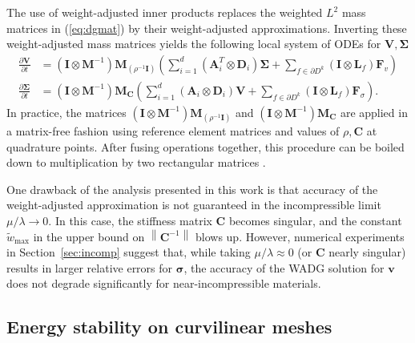 \documentclass{siamart0216}
\newcommand{\pd}[2]{\frac{\partial#1}{\partial#2}}
\newcommand{\nor}[1]{\left\| #1 \right\|}
\newcommand{\LRp}[1]{\left( #1 \right)}
\begin{document}
The use of weight-adjusted inner products replaces the weighted $L^2$ mass matrices in (\ref{eq:dgmat}) by their weight-adjusted approximations.  
Inverting these weight-adjusted mass matrices yields the following local system of ODEs for $\bm{V},\bm{\Sigma}$
\begin{align*}
\pd{\bm{V}}{t} &= \LRp{\bm{I}\otimes\bm{M}^{-1}} \bm{M}_{\LRp{\rho^{-1}\bm{I}}} \LRp{\sum_{i=1}^d  \LRp{\bm{A}_i^T\otimes \bm{D}_{i}} \bm{\Sigma} + \sum_{f\in \partial D^k}\LRp{\bm{I}\otimes \bm{L}_f}\bm{F}_{v}} \nonumber\\
\pd{\bm{\Sigma}}{t} &= \LRp{\bm{I}\otimes\bm{M}^{-1}} \bm{M}_{\bm{C}}  \LRp{\sum_{i=1}^d \LRp{\bm{A}_i\otimes \bm{D}_{i}}\bm{V}  +  \sum_{f\in \partial D^k}\LRp{\bm{I}\otimes\bm{L}_f}\bm{F}_{\sigma}}. 
\label{eq:wadgmat}
\end{align*}
In practice, the matrices $\LRp{\bm{I}\otimes\bm{M}^{-1}} \bm{M}_{\LRp{\rho^{-1}\bm{I}}}$ and $\LRp{\bm{I}\otimes\bm{M}^{-1}} \bm{M}_{\bm{C}}$ are applied in a matrix-free fashion using reference element matrices and values of $\rho,\bm{C}$ at quadrature points.  After fusing operations together, this procedure can be boiled down to multiplication by two rectangular matrices \cite{chan2016weight2}.  

One drawback of the analysis presented in this work is that accuracy of the weight-adjusted approximation is not guaranteed in the incompressible limit $\mu / \lambda \rightarrow 0$.  In this case, the stiffness matrix $\bm{C}$ becomes singular, and the constant $\tilde{w}_{\max}$ in the upper bound on $\nor{\bm{C}^{-1}}$ blows up.  However, numerical experiments in Section~\ref{sec:incomp} suggest that, while taking $\mu/\lambda \approx 0$ (or $\bm{C}$ nearly singular) results in larger relative errors for $\bm{\sigma}$, the accuracy of the WADG solution for $\bm{v}$ does not degrade significantly for near-incompressible materials.  

\subsection{Energy stability on curvilinear meshes}
\end{document}
